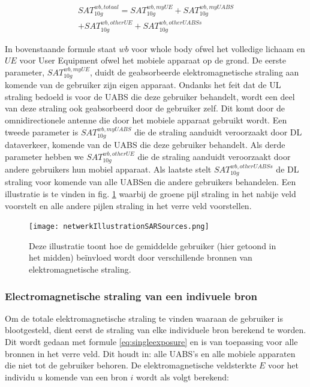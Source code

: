 \documentclass[twocolumn]{phdsymp_dutch}
\begin{document}
\begin{equation} 
\begin{aligned}
SAT^{wb,totaal}_{10g} = SAT^{wb,myUE}_{10g} +  SAT^{wb,myUABS}_{10g} \\
+ SAT^{wb,otherUE}_{10g} + SAT^{wb,otherUABSs}_{10g}
\end{aligned}
\label{eq:overallSARwb}
\end{equation}

In bovenstaande formule staat $wb$ voor whole body ofwel het volledige lichaam en $UE$ voor User Equipment ofwel het mobiele apparaat op de grond.
De eerste parameter, $SAT^{wb,myUE}_{10g}$, duidt de geabsorbeerde elektromagnetische straling aan komende van de gebruiker zijn eigen apparaat.
Ondanks het feit dat de \gls{UL} straling bedoeld is voor de \gls{UABS} die deze gebruiker behandelt,
wordt een deel van deze straling ook geabsorbeerd door de gebruiker zelf.
Dit komt door de omnidirectionele antenne die door het mobiele apparaat gebruikt wordt.
Een tweede parameter is $SAT^{wb,myUABS}_{10g}$ die de straling aanduidt veroorzaakt door \gls{DL} dataverkeer, komende van de \gls{UABS} die deze gebruiker behandelt.
Als derde parameter hebben we $SAT^{wb,otherUE}_{10g}$ die de straling aanduidt veroorzaakt door andere gebruikers hun mobiel apparaat.
Als laatste stelt $SAT^{wb,otherUABSs}_{10g}$ de \gls{DL} straling voor komende van alle \gls{UABS}en die andere gebruikers behandelen.
Een illustratie is te vinden in fig. \ref{fig:netwerkIllustration} waarbij de groene pijl straling in het nabije veld voorstelt en alle andere 
pijlen straling in het verre veld voorstellen.

\begin{figure}[h!]
\centering
  \texttt{[image: netwerkIllustrationSARSources.png]}
  \caption{Deze illustratie toont hoe de gemiddelde gebruiker (hier getoond in het midden) be\"invloed wordt door verschillende bronnen van elektromagnetische straling.}
  \label{fig:netwerkIllustration}
\end{figure}

\subsubsection{Electromagnetische straling van een indivuele bron}
\label{sec:calculatingexposure}

Om de totale elektromagnetische straling te vinden waaraan de gebruiker is blootgesteld, dient eerst
de straling van elke individuele bron berekend te worden.
Dit wordt gedaan met formule  \ref{eq:singleexposure} en is van toepassing voor alle bronnen in het verre veld.
Dit houdt in: alle  \gls{UABS}'s en alle mobiele apparaten die niet tot de gebruiker behoren.
De elektromagnetische veldsterkte $E$ voor het individu $u$ komende van een bron $i$ wordt als volgt berekend:
\end{document}
